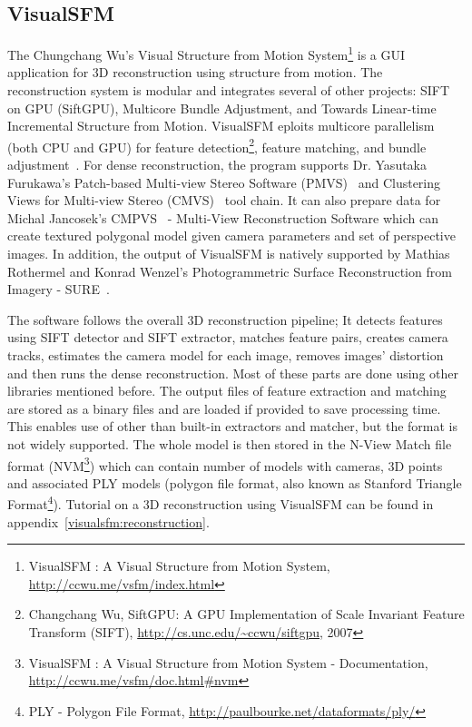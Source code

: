 \subsection*{VisualSFM}
The Chungchang Wu's Visual Structure from Motion System\footnote{VisualSFM : A Visual Structure from Motion System, \url{http://ccwu.me/vsfm/index.html}} is a GUI application for 3D reconstruction using structure from motion. The reconstruction system is modular and integrates several of other projects: SIFT on GPU (SiftGPU), Multicore Bundle Adjustment, and Towards Linear-time Incremental Structure from Motion. VisualSFM eploits multicore parallelism (both CPU and GPU) for feature detection\footnote{Changchang Wu, SiftGPU: A GPU Implementation of Scale Invariant Feature Transform (SIFT), \url{http://cs.unc.edu/~ccwu/siftgpu}, 2007}, feature matching, and bundle adjustment~\cite{www:multicore-ba}. For dense reconstruction, the program supports Dr. Yasutaka Furukawa's Patch-based Multi-view Stereo Software (PMVS)~\cite{pmvs} and Clustering Views for Multi-view Stereo (CMVS)~\cite{cmvs} tool chain. It can also prepare data for Michal Jancosek's CMPVS~\cite{book:cmpmvs} - Multi-View Reconstruction Software which can create textured polygonal model given camera parameters and set of perspective images. In addition, the output of VisualSFM is natively supported by Mathias Rothermel and Konrad Wenzel's Photogrammetric Surface Reconstruction from Imagery - SURE~\cite{www:sure}.

The software follows the overall 3D reconstruction pipeline; It detects features using SIFT detector and SIFT extractor, matches feature pairs, creates camera tracks, estimates the camera model for each image, removes images' distortion and then runs the dense reconstruction. Most of these parts are done using other libraries mentioned before. The output files of feature extraction and matching are stored as a binary files and are loaded if provided to save processing time. This enables use of other than built-in extractors and matcher, but the format is not widely supported. The whole model is then stored in the N-View Match file format (NVM\footnote{VisualSFM : A Visual Structure from Motion System - Documentation, \url{http://ccwu.me/vsfm/doc.html\#nvm}}) which can contain number of models with cameras, 3D points and associated PLY models (polygon file format, also known as Stanford Triangle Format\footnote{PLY - Polygon File Format, \url{http://paulbourke.net/dataformats/ply/}}). Tutorial on a 3D reconstruction using VisualSFM can be found in appendix~\ref{visualsfm:reconstruction}.


